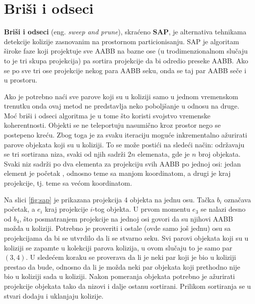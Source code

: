 \documentclass[12pt,oneside]{memoir}
\begin{document}
\section{Briši i odseci}
\label{subsec:sap}

\textbf{Briši i odseci} (eng. {\em sweep and prune}), skraćeno \textbf{SAP}, je alternativa tehnikama detekcije kolizije 
zasnovanim na prostornom particionisanju.
SAP je algoritam široke faze koji projektuje sve AABB
na bazne ose (u trodimenzionalnom slučaju to je tri skupa projekcija) pa sortira projekcije da bi odredio preseke AABB.
Ako se po sve tri ose projekcije nekog para AABB seku, onda se taj par AABB seče i u prostoru.

Ako je potrebno naći sve parove koji su u koliziji samo u jednom vremenskom trenutku onda ovaj metod ne predstavlja neko poboljšanje u odnosu na druge.
Moć briši i odseci algoritma je u tome što koristi svojstvo vremenske koherentnosti.
Objekti se ne teleportuju nasumično kroz prostor nego se postepeno kreću. 
Zbog toga je za svaku iteraciju moguće inkrementalno ažurirati parove objekata koji su u koliziji.
To se može postići na sledeći način: održavaju se tri sortirana niza, svaki od njih sadrži $2n$ elemenata, gde je $n$ broj objekata.
Svaki niz sadrži po dva elementa za projekciju svih AABB po jednoj osi: jedan element je početak 
, odnosno teme sa manjom koordinatom, a drugi je kraj projekcije, tj. teme sa većom koordinatom. 

Na slici \ref{fig:sap} je prikazana projekcija 4 objekta na jednu osu. 
Tačka $b_i$ označava početak, a $e_i$ kraj projekcije $i$-tog objekta.
U prvom momentu $e_3$ se nalazi desno od $b_4$, što posmatranjem projekcije na jednoj osi govori da su njihovi AABB možda u koliziji.
Potrebno je proveriti i ostale (ovde samo još jednu) osu sa projekcijama da bi se utvrdilo da li se stvarno seku.
Svi parovi objekata koji su u koliziji se zapamte u kolekciji parova kolizija, u ovom slučaju to je samo par $(3, 4)$.
U sledećem koraku se proverava da li je neki par koji je bio u koliziji prestao da bude, 
odnosno da li je možda neki par objekata koji prethodno nije bio u koliziji sada u koliziji.
Nakon pomeranja objekata potrebno je ažurirati projekcije objekata tako da nizovi i dalje ostanu sortirani.
Prilikom sortiranja se u stvari dodaju i uklanjaju kolizije.
\end{document}

